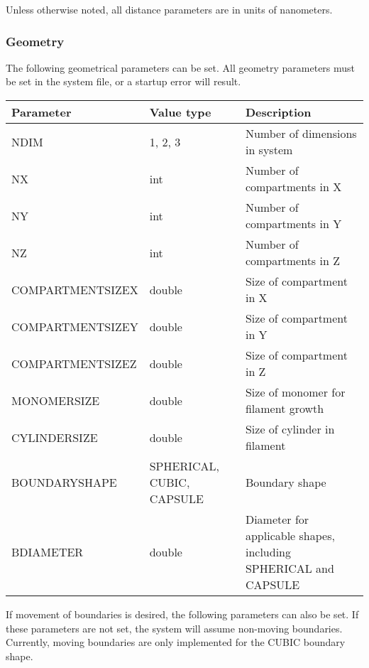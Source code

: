 \documentclass[11pt, oneside]{article}   	%
\begin{document}
 \noindent Unless otherwise noted, all distance parameters are in units of nanometers. 

\subsubsection{Geometry}

The following geometrical parameters can be set. All geometry parameters must be set in the system file, or a startup error will result. 

\begin{table} [!ht]
\centering
\begin{tabular}{|L{5cm}|C{3cm}|L{5.2cm}|}  
\hline
 \textbf{Parameter} & \textbf{Value type} & \textbf{Description} \\
 \hline
  NDIM & 1, 2, 3 & Number of dimensions in system \\
  \hline
  NX & int & Number of compartments in X \\
  \hline
  NY & int & Number of compartments in Y \\
  \hline
  NZ & int & Number of compartments in Z \\
  \hline
  COMPARTMENTSIZEX & double & Size of compartment in X \\
  \hline
  COMPARTMENTSIZEY & double & Size of compartment in Y \\
  \hline
  COMPARTMENTSIZEZ & double & Size of compartment in Z \\
  \hline
  MONOMERSIZE & double & Size of monomer for filament growth \\
  \hline
  CYLINDERSIZE & double & Size of cylinder in filament\\
  \hline
  BOUNDARYSHAPE & SPHERICAL, CUBIC, CAPSULE & Boundary shape \\
  \hline
  BDIAMETER & double & Diameter for applicable shapes, including SPHERICAL and CAPSULE \\
  \hline
\end{tabular}
\end{table}

\break
\noindent If movement of boundaries is desired, the following parameters can also be set. If these parameters are not set, the system will assume non-moving boundaries. Currently, moving boundaries are only implemented for the CUBIC boundary shape.
\end{document}
